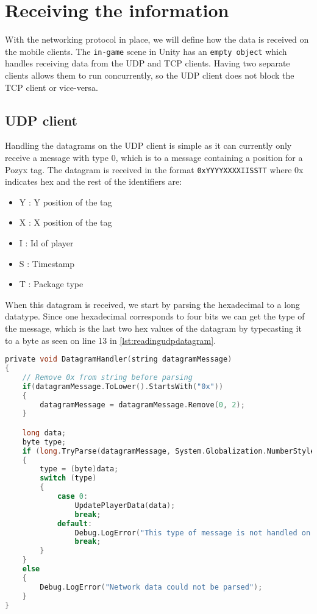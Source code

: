 \section{Receiving the information}
With the networking protocol in place, we will define how the data is received on the mobile clients.
The \texttt{in-game} scene in Unity has an \texttt{empty object} which handles receiving data from the UDP and TCP clients.
Having two separate clients allows them to run concurrently, so the UDP client does not block the TCP client or vice-versa.

\subsection*{UDP client}
Handling the datagrams on the UDP client is simple as it can currently only receive a message with type 0, which is to a message containing a position for a Pozyx tag.
The datagram is received in the format \texttt{0xYYYYXXXXIISSTT} where 0x indicates hex and the rest of the identifiers are:
\begin{itemize}
    \item Y : Y position of the tag
    \item X : X position of the tag
    \item I : Id of player
    \item S : Timestamp
    \item T : Package type
\end{itemize}

\noindent
When this datagram is received, we start by parsing the hexadecimal to a long datatype.
Since one hexadecimal corresponds to four bits we can get the type of the message, which is the last two hex values of the datagram by typecasting it to a byte as seen on line 13 in \autoref{lst:readingudpdatagram}.

\begin{lstlisting}[caption={Processing datagrams in UDP client}, captionpos=b,language=C,label={lst:readingudpdatagram}]
private void DatagramHandler(string datagramMessage)
{
    // Remove 0x from string before parsing
    if(datagramMessage.ToLower().StartsWith("0x"))
    {
        datagramMessage = datagramMessage.Remove(0, 2);
    }

    long data;
    byte type;
    if (long.TryParse(datagramMessage, System.Globalization.NumberStyles.HexNumber, System.Globalization.CultureInfo.InvariantCulture, out data))
    {
        type = (byte)data;
        switch (type)
        {
            case 0:
                UpdatePlayerData(data);
                break;
            default:
                Debug.LogError("This type of message is not handled on UDP");
                break;
        }
    }
    else
    {
        Debug.LogError("Network data could not be parsed");
    }
}
\end{lstlisting}


